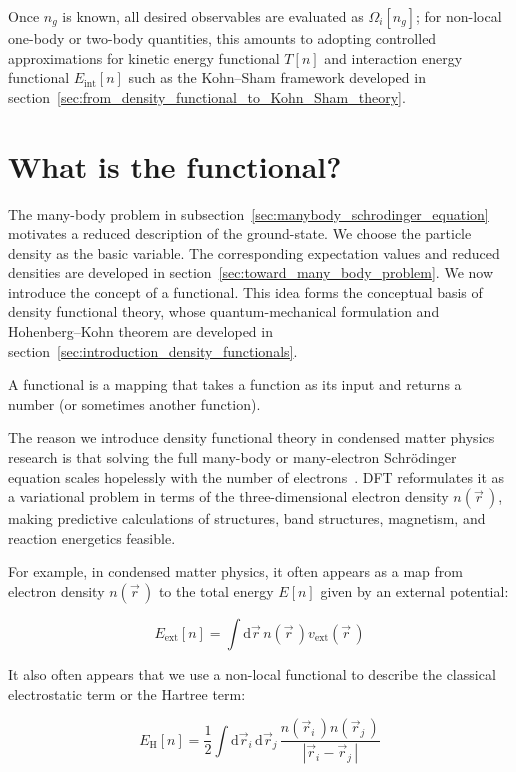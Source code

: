 Once $n_g$ is known, all desired observables are evaluated as $\Omega_i[n_g]$; 
for non-local one-body or two-body quantities,
this amounts to adopting controlled approximations for kinetic energy functional $T[n]$ and interaction energy functional $E_\mathrm{int}[n]$ such as the Kohn--Sham framework developed in section~\ref{sec:from_density_functional_to_Kohn_Sham_theory}.

\newpage
\section{What is the functional?}
\label{sec:appendix_functionals}

The many-body problem in subsection~\ref{sec:manybody_schrodinger_equation} motivates a reduced description of the ground-state.
We choose the particle density as the basic variable.
The corresponding expectation values and reduced densities are developed in section~\ref{sec:toward_many_body_problem}.
We now introduce the concept of a functional.
This idea forms the conceptual basis of density functional theory,
whose quantum-mechanical formulation and Hohenberg--Kohn theorem are developed in section~\ref{sec:introduction_density_functionals}.

A functional is a mapping that takes a function as its input and returns a number (or sometimes another function).

The reason we introduce density functional theory in condensed matter physics research is that solving the full many-body or many-electron Schrödinger equation scales hopelessly with the number of electrons~\cite{becke2014perspective}.
DFT reformulates it as a variational problem in terms of the three-dimensional electron density
$n(\vec{r}\,)$, making predictive calculations of structures, band structures, magnetism, and reaction energetics feasible.

For example, in condensed matter physics, it often appears as a map from electron density $n(\vec{r}\,)$ to the total energy $E[n]$ given by an external potential:

\begin{equation}
    E_\mathrm{ext}[n]=\int\mathrm{d}\vec{r}\,n(\vec{r}\,)v_\mathrm{ext}(\vec{r}\,)
\label{functional_energy_potential}
\end{equation}

It also often appears that we use a non-local functional to describe the classical electrostatic term or the Hartree term:

\begin{equation}
    E_\mathrm{H}[n]=\frac{1}{2}\int\mathrm{d}\vec{r}_i\,\mathrm{d}\vec{r}_j\,\frac{n(\vec{r}_i\,)n(\vec{r}_j\,)}{|\vec{r}_i-\vec{r}_j\,|}
\label{hartree_functional}
\end{equation}

